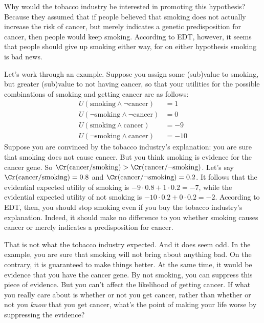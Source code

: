Why would the tobacco industry be interested in promoting this
hypothesis? Because they assumed that if people believed that smoking
does not actually increase the risk of cancer, but merely indicates a
genetic predisposition for cancer, then people would keep smoking.
According to EDT, however, it seems that people should give up smoking
either way, for on either hypothesis smoking is bad news.

Let's work through an example. Suppose you assign some (sub)value to
smoking, but greater (sub)value to not having cancer, so that your
utilities for the possible combinations of smoking and getting cancer
are as follows:
%
\begin{align*}
U(\text{smoking} \land \neg\text{cancer}) &= 1\\
U(\neg \text{smoking} \land \neg\text{cancer}) &= 0\\
U(\text{smoking} \land \text{cancer}) &= -9\\
U(\neg\text{smoking} \land \text{cancer}) &= -10
\end{align*}
Suppose you are convinced by the tobacco industry's explanation: you
are sure that smoking does not cause cancer. But you think
smoking is evidence for the cancer gene. So
$\Cr(\text{cancer}/\text{smoking}) > \Cr(\text{cancer}/\neg
\text{smoking})$. Let's say $\Cr(\text{cancer}/\text{smoking}) = 0.8$
and $\Cr(\text{cancer}/\neg\text{smoking}) = 0.2$. It follows that the
evidential expected utility of smoking is $-9 \cdot 0.8 + 1 \cdot 0.2
= -7$, while the evidential expected utility of not smoking is $-10
\cdot 0.2 + 0 \cdot 0.2 = -2$.  According to EDT, then, you should
stop smoking even if you buy the tobacco industry's
explanation. Indeed, it should make no difference to you whether
smoking causes cancer or merely indicates a predisposition for cancer.

That is not what the tobacco industry expected. And it does seem
odd. In the example, you are sure that smoking will not bring about
anything bad. On the contrary, it is guaranteed to make things
better. At the same time, it would be evidence that you have the
cancer gene. By not smoking, you can suppress this piece of evidence.
But you can't affect the likelihood of getting cancer. If what you
really care about is whether or not you get cancer, rather than
whether or not you \emph{know} that you get cancer, what's the point
of making your life worse by suppressing the evidence?

